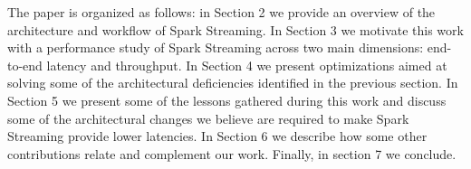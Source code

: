 The paper is organized as follows: 
in Section 2 we provide an overview of the architecture and workflow of Spark Streaming. 
In Section 3 we motivate this work with a performance study of Spark Streaming across two main dimensions: end-to-end latency and throughput.
In Section 4 we present optimizations aimed at solving some of the architectural deficiencies identified in the previous section.
In Section 5 we present some of the lessons gathered during this work and discuss some of the architectural changes we believe are required to make Spark Streaming provide lower latencies.
In Section 6 we describe how some other contributions relate and complement our work.
Finally, in section 7 we conclude.
